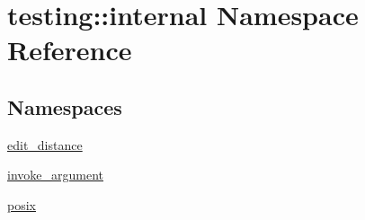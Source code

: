 \hypertarget{namespacetesting_1_1internal}{}\section{testing\+:\+:internal Namespace Reference}
\label{namespacetesting_1_1internal}
\subsection*{Namespaces}
\begin{DoxyCompactItemize}
\item 
 \hyperlink{namespacetesting_1_1internal_1_1edit__distance}{edit\+\_\+distance}
\item 
 \hyperlink{namespacetesting_1_1internal_1_1invoke__argument}{invoke\+\_\+argument}
\item 
 \hyperlink{namespacetesting_1_1internal_1_1posix}{posix}
\end{DoxyCompactItemize}

